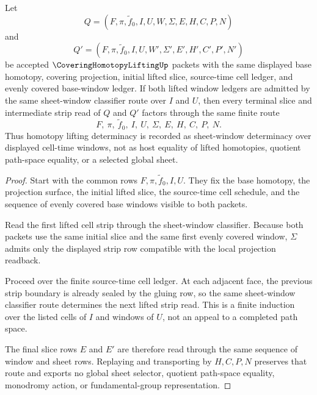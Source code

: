 \begin{theorem}
\label{thm:covering-homotopy-lifting-sheet-window-determinacy}
Let
$$
Q=(F,\pi,\tilde f_0,I,U,W,\Sigma,E,H,C,P,N)
$$
and
$$
Q'=(F,\pi,\tilde f_0,I,U,W',\Sigma',E',H',C',P',N')
$$
be accepted $\CoveringHomotopyLiftingUp$ packets with the same displayed base homotopy, covering projection, initial lifted slice, source-time cell ledger, and evenly covered base-window ledger. If both lifted window ledgers are admitted by the same sheet-window classifier route over $I$ and $U$, then every terminal slice and intermediate strip read of $Q$ and $Q'$ factors through the same finite route
$$
F,\ \pi,\ \tilde f_0,\ I,\ U,\ \Sigma,\ E,\ H,\ C,\ P,\ N .
$$
Thus homotopy lifting determinacy is recorded as sheet-window determinacy over displayed cell-time windows, not as host equality of lifted homotopies, quotient path-space equality, or a selected global sheet.
\end{theorem}
\begin{proof}
Start with the common rows $F,\pi,\tilde f_0,I,U$. They fix the base homotopy, the projection surface, the initial lifted slice, the source-time cell schedule, and the sequence of evenly covered base windows visible to both packets.

Read the first lifted cell strip through the sheet-window classifier. Because both packets use the same initial slice and the same first evenly covered window, $\Sigma$ admits only the displayed strip row compatible with the local projection readback.

Proceed over the finite source-time cell ledger. At each adjacent face, the previous strip boundary is already sealed by the gluing row, so the same sheet-window classifier route determines the next lifted strip read. This is a finite induction over the listed cells of $I$ and windows of $U$, not an appeal to a completed path space.

The final slice rows $E$ and $E'$ are therefore read through the same sequence of window and sheet rows. Replaying and transporting by $H,C,P,N$ preserves that route and exports no global sheet selector, quotient path-space equality, monodromy action, or fundamental-group representation.
\end{proof}


